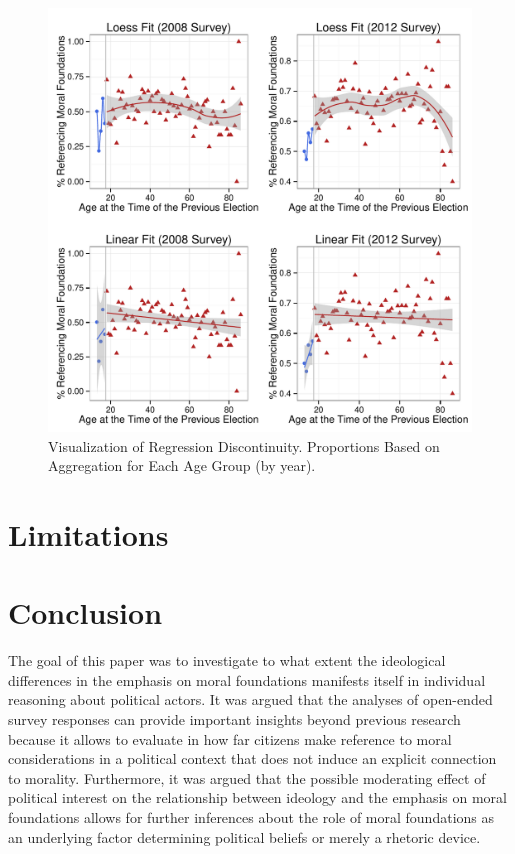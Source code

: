 \documentclass[12pt]{article}
\begin{document}
\begin{figure}\centering
\includegraphics[scale=.8]{../calc/fig/rd1_overview.pdf}
\caption{Visualization of Regression Discontinuity. Proportions Based on Aggregation for Each Age Group (by year).}\label{fig:m2_vote}
\end{figure}






\section{Limitations}

\section{Conclusion}

The goal of this paper was to investigate to what extent the ideological differences in the emphasis on moral foundations manifests itself in individual reasoning about political actors. It was argued that the analyses of open-ended survey responses can provide important insights beyond previous research because it allows to evaluate in how far citizens make reference to moral considerations in a political context that does not induce an explicit connection to morality. Furthermore, it was argued that the possible moderating effect of political interest on the relationship between ideology and the emphasis on moral foundations allows for further inferences about the role of moral foundations as an underlying factor determining political beliefs or merely a rhetoric device.
\end{document}
